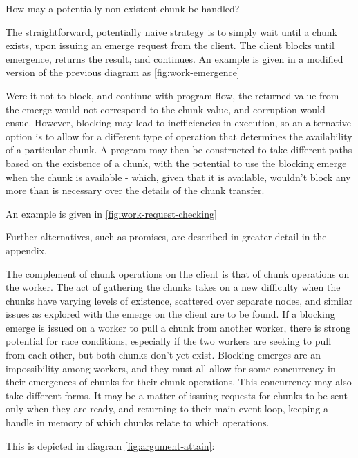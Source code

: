 How may a potentially non-existent chunk be handled?

The straightforward, potentially naive strategy is to simply wait until a chunk exists, upon issuing an emerge request from the client.
The client blocks until emergence, returns the result, and continues.
An example is given in a modified version of the previous diagram as \cref{fig:work-emergence}


Were it not to block, and continue with program flow, the returned value from the emerge would not correspond to the chunk value, and corruption would ensue.
However, blocking may lead to inefficiencies in execution, so an alternative option is to allow for a different type of operation that determines the availability of a particular chunk.
A program may then be constructed to take different paths based on the existence of a chunk, with the potential to use the blocking emerge when the chunk is available - which, given that it is available, wouldn't block any more than is necessary over the details of the chunk transfer.

An example is given in \cref{fig:work-request-checking}


Further alternatives, such as promises, are described in greater detail in the appendix.

The complement of chunk operations on the client is that of chunk operations on the worker.
The act of gathering the chunks takes on a new difficulty when the chunks have varying levels of existence, scattered over separate nodes, and similar issues as explored with the emerge on the client are to be found.
If a blocking emerge is issued on a worker to pull a chunk from another worker, there is strong potential for race conditions, especially if the two workers are seeking to pull from each other, but both chunks don't yet exist.
Blocking emerges are an impossibility among workers, and they must all allow for some concurrency in their emergences of chunks for their chunk operations.
This concurrency may also take different forms.
It may be a matter of issuing requests for chunks to be sent only when they are ready, and returning to their main event loop, keeping a handle in memory of which chunks relate to which operations.

This is depicted in diagram \cref{fig:argument-attain}:

